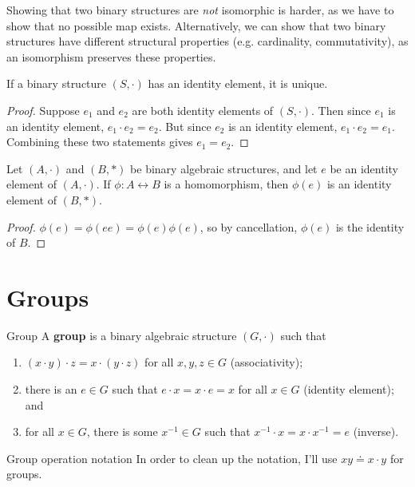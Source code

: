 \documentclass[10pt]{report}
\begin{document}
Showing that two binary structures are \textit{not} isomorphic is harder, as we have to show that no possible map exists. Alternatively, we can show that two binary structures have different structural properties (e.g. cardinality, commutativity), as an isomorphism preserves these properties.

\begin{prop}
	If a binary structure $(S, \cdot)$ has an identity element, it is unique.
\end{prop}
\begin{proof}
	Suppose $e_1$ and $e_2$ are both identity elements of $(S, \cdot)$. Then since $e_1$ is an identity element, $e_1 \cdot e_2 = e_2$. But since $e_2$ is an identity element, $e_1 \cdot e_2 = e_1$. Combining these two statements gives $e_1=e_2$.
\end{proof}

\begin{prop}
	Let $(A, \cdot)$ and $(B, *)$ be binary algebraic structures, and let $e$ be an identity element of $ (A, \cdot)$. If $\phi: A \leftrightarrow B$ is a homomorphism, then $\phi(e)$ is an identity element of $(B, *)$.
\end{prop}
\begin{proof}
	$\phi(e) = \phi(ee) = \phi(e)\phi(e)$, so by cancellation, $\phi(e)$ is the identity of $B$.
\end{proof}



\section{Groups}


\begin{defn}{Group}{}
A \textbf{group} is a binary algebraic structure $(G, \cdot)$ such that
\begin{enumerate}
	\item $(x\cdot y) \cdot z = x \cdot (y \cdot z)$ for all $x,y,z \in G$ (associativity);
	\item there is an $e \in G$ such that $e \cdot x = x \cdot e = x$ for all $x \in G$ (identity element); and
	\item for all $x \in G$, there is some $x^{-1} \in G$ such that $x^{-1} \cdot x = x \cdot x^{-1} = e$ (inverse).
\end{enumerate}
\end{defn}

\begin{note}{Group operation notation}{}
In order to clean up the notation, I'll use $xy \doteq x \cdot y$ for groups.
\end{note}
\end{document}
